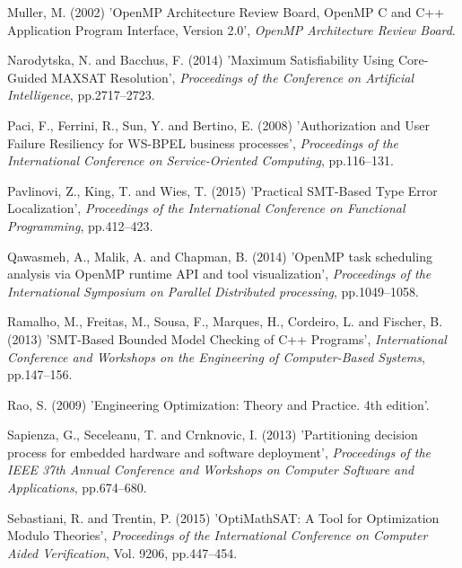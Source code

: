 \documentclass{doublecol-new}
\theoremstyle{TH}{
\newtheorem{lemma}{Lemma}
\newtheorem{theorem}[lemma]{Theorem}
\newtheorem{corrolary}[lemma]{Corrolary}
\newtheorem{conjecture}[lemma]{Conjecture}
\newtheorem{proposition}[lemma]{Proposition}
\newtheorem{claim}[lemma]{Claim}
\newtheorem{stheorem}[lemma]{Wrong Theorem}
\newtheorem{algorithm}{Algorithm}
}
\theoremstyle{THrm}{
\newtheorem{definition}{Definition}[section]
\newtheorem{question}{Question}[section]
\newtheorem{remark}{Remark}
\newtheorem{scheme}{Scheme}
}
\theoremstyle{THhit}{
\newtheorem{case}{Case}[section]
}
\begin{document}
\begin{thebibliography}{10}
Muller, M. (2002) 'OpenMP Architecture Review Board, OpenMP C and C++ Application Program Interface, Version 2.0', {\it OpenMP Architecture Review Board}.

Narodytska, N. and Bacchus, F. (2014) 'Maximum Satisfiability Using Core-Guided MAXSAT Resolution', {\it Proceedings of the Conference on Artificial Intelligence}, pp.2717--2723.

Paci, F., Ferrini, R., Sun, Y. and Bertino, E. (2008) 'Authorization and User Failure Resiliency for WS-BPEL business processes', {\it Proceedings of the International Conference on Service-Oriented Computing}, pp.116--131.

Pavlinovi, Z., King, T. and Wies, T. (2015) 'Practical SMT-Based Type Error Localization', {\it Proceedings of the International Conference on Functional Programming}, pp.412--423.

Qawasmeh, A., Malik, A. and Chapman, B. (2014) 'OpenMP task scheduling analysis via OpenMP runtime API and tool visualization', {\it Proceedings of the International Symposium on Parallel Distributed processing}, pp.1049--1058.

Ramalho, M., Freitas, M., Sousa, F., Marques, H., Cordeiro, L. and Fischer, B. (2013) 'SMT-Based Bounded Model Checking of C++ Programs', {\it International Conference and Workshops on the Engineering of Computer-Based Systems}, pp.147--156.

Rao, S. (2009) 'Engineering Optimization: Theory and Practice. 4th edition'.

Sapienza, G., Seceleanu, T. and Crnknovic, I. (2013) 'Partitioning decision process for embedded hardware and
software deployment', {\it Proceedings of the IEEE 37th Annual Conference and Workshops on Computer Software and
Applications}, pp.674--680.

Sebastiani, R. and Trentin, P. (2015) 'OptiMathSAT: A Tool for Optimization Modulo Theories', {\it Proceedings of the International Conference on Computer Aided Verification}, Vol. 9206, pp.447--454.


\end{thebibliography}
\end{document}
